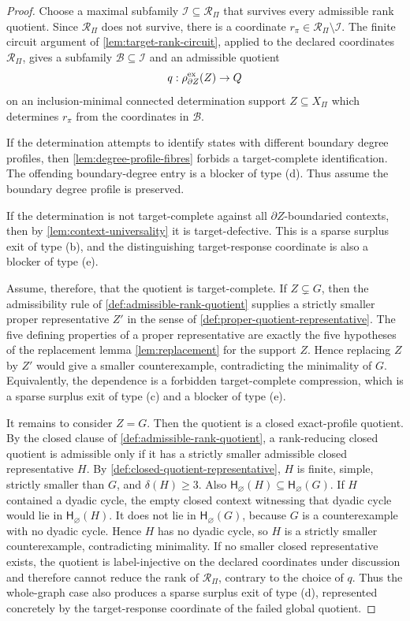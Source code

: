 \documentclass[11pt]{article}
\newcommand{\profile}{\mathsf H}
\begin{document}
\begin{proof}
Choose a maximal subfamily \(\mathcal I\subseteq\mathcal R_\Pi\) that survives
every admissible rank quotient.  Since \(\mathcal R_\Pi\) does not survive,
there is a coordinate \(r_\pi\in\mathcal R_\Pi\setminus\mathcal I\).  The
finite circuit argument of \cref{lem:target-rank-circuit}, applied to the
declared coordinates \(\mathcal R_\Pi\), gives a subfamily
\(\mathcal B\subseteq\mathcal I\) and an admissible quotient
\[
q:\rho_{\partial Z}^{\rm ex}(Z)\to Q
\]
on an inclusion-minimal connected determination support \(Z\subseteq X_\Pi\)
which determines \(r_\pi\) from the coordinates in \(\mathcal B\).

If the determination attempts to identify states with different boundary degree
profiles, then \cref{lem:degree-profile-fibres} forbids a target-complete
identification.  The offending boundary-degree entry is a blocker of type (d).
Thus assume the boundary degree profile is preserved.

If the determination is not target-complete against all
\(\partial Z\)-boundaried contexts, then by
\cref{lem:context-universality} it is target-defective.  This is a sparse
surplus exit of type (b), and the distinguishing target-response coordinate is
also a blocker of type (e).

Assume, therefore, that the quotient is target-complete.  If \(Z\subsetneq G\),
then the admissibility rule of \cref{def:admissible-rank-quotient} supplies a
strictly smaller proper representative \(Z'\) in the sense of
\cref{def:proper-quotient-representative}.  The five defining properties of a
proper representative are exactly the five hypotheses of the replacement lemma
\cref{lem:replacement} for the support \(Z\).  Hence replacing \(Z\) by \(Z'\)
would give a smaller counterexample, contradicting the minimality of \(G\).
Equivalently, the dependence is a forbidden target-complete compression, which
is a sparse surplus exit of type (c) and a blocker of type (e).

It remains to consider \(Z=G\).  Then the quotient is a closed exact-profile
quotient.  By the closed clause of \cref{def:admissible-rank-quotient}, a
rank-reducing closed quotient is admissible only if it has a strictly smaller
admissible closed representative \(H\).  By
\cref{def:closed-quotient-representative}, \(H\) is finite, simple, strictly
smaller than \(G\), and \(\delta(H)\ge3\).  Also
\(\profile_\varnothing(H)\subseteq\profile_\varnothing(G)\).  If \(H\)
contained a dyadic cycle, the empty closed context witnessing that dyadic cycle
would lie in \(\profile_\varnothing(H)\).  It does not lie in
\(\profile_\varnothing(G)\), because \(G\) is a counterexample with no dyadic
cycle.  Hence \(H\) has no dyadic cycle, so \(H\) is a strictly smaller
counterexample, contradicting minimality.  If no smaller closed representative
exists, the quotient is label-injective on the declared coordinates under
discussion and therefore cannot reduce the rank of \(\mathcal R_\Pi\), contrary
to the choice of \(q\).  Thus the whole-graph case also produces a sparse
surplus exit of type (d), represented concretely by the target-response
coordinate of the failed global quotient.
\end{proof}
\end{document}
